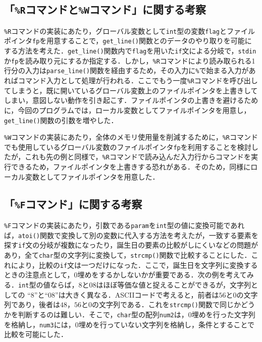 \subsection{「\texttt{\%R}コマンドと\texttt{\%W}コマンド」に関する考察}

\verb|%R|コマンドの実装にあたり，グローバル変数として\verb|int|型の変数\verb|flag|とファイルポインタ\verb|fp|を用意することで，\verb|get_line()|関数とのデータのやり取りを可能にする方法を考えた．\verb|get_line()|関数内で\verb|flag|を用いた\verb|if|文による分岐で，\verb|stdin|か\verb|fp|を読み取り元にするか指定する．しかし，\verb|%R|コマンドにより読み取られる1行分の入力は\verb|parse_line()|関数を経由するため，その入力に\verb|%|で始まる入力があればコマンド入力として処理が行われる．ここでもう一度\verb|%R|コマンドを呼び出してしまうと，既に開いているグローバル変数上のファイルポインタを上書きしてしまい，意図しない動作を引き起こす．ファイルポインタの上書きを避けるために，今回のプログラムでは，ローカル変数としてファイルポインタを用意し，\verb|get_line()|関数の引数を増やした．

\verb|%W|コマンドの実装にあたり，全体のメモリ使用量を削減するために，\verb|%R|コマンドでも使用しているグローバル変数のファイルポインタ\verb|fp|を利用することを検討したが，これも先の例と同様で，\verb|%R|コマンドで読み込んだ入力行からコマンドを実行できるため，ファイルポインタを上書きする恐れがある．そのため，同様にローカル変数としてファイルポインタを用意した．

\subsection{「\texttt{\%F}コマンド」に関する考察}

\verb|%F|コマンドの実装にあたり，引数である\verb|param|を\verb|int|型の値に変換可能であれば，\verb|atoi()|関数で変換して別の変数に代入する方法を考えたが，一致する要素を探す\verb|if|文の分岐が複数になったり，誕生日の要素の比較がしにくいなどの問題があり，全て\verb|char|型の文字列に変換して，\verb|strcmp()|関数で比較することにした．これにより，比較の\verb|if|文は一つだけになった．ここで，誕生日を文字列に変換するときの注意点として，$0$埋めをするかしないかが重要である．次の例を考えてみる．\verb|int|型の値ならば，$8$と$08$はほぼ等価な値と捉えることができるが，文字列としての “$8$”と“$08$”は大きく異なる．ASCIIコードで考えると，前者は$56$と$0$の文字列であり，後者は$48$，$56$と$0$の文字列である．これを\verb|strcmp()|関数で同じかどうかを判断するのは難しい\cite{www:label11}．そこで，\verb|char|型の配列\verb|num2|は，$0$埋めを行った文字列を格納し，\verb|num3|には，$0$埋めを行っていない文字列を格納し，条件とすることで比較を可能にした．


